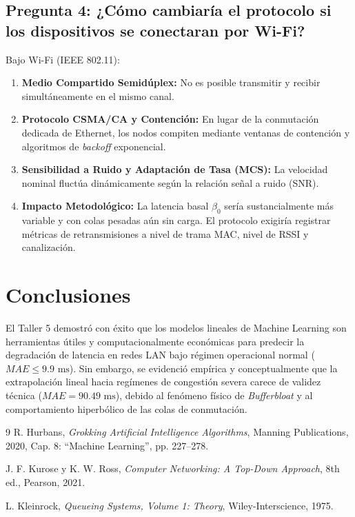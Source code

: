 \documentclass[10pt,twocolumn,letterpaper]{article}
\begin{document}
\subsection{Pregunta 4: ¿Cómo cambiaría el protocolo si los dispositivos se conectaran por Wi-Fi?}
Bajo Wi-Fi (IEEE 802.11):
\begin{enumerate}
    \item \textbf{Medio Compartido Semidúplex:} No es posible transmitir y recibir simultáneamente en el mismo canal.
    \item \textbf{Protocolo CSMA/CA y Contención:} En lugar de la conmutación dedicada de Ethernet, los nodos compiten mediante ventanas de contención y algoritmos de \textit{backoff} exponencial.
    \item \textbf{Sensibilidad a Ruido y Adaptación de Tasa (MCS):} La velocidad nominal fluctúa dinámicamente según la relación señal a ruido (SNR).
    \item \textbf{Impacto Metodológico:} La latencia basal $\beta_0$ sería sustancialmente más variable y con colas pesadas aún sin carga. El protocolo exigiría registrar métricas de retransmisiones a nivel de trama MAC, nivel de RSSI y canalización.
\end{enumerate}

\section{Conclusiones}
El Taller 5 demostró con éxito que los modelos lineales de Machine Learning son herramientas útiles y computacionalmente económicas para predecir la degradación de latencia en redes LAN bajo régimen operacional normal ($MAE \le 9.9\text{ ms}$). Sin embargo, se evidenció empírica y conceptualmente que la extrapolación lineal hacia regímenes de congestión severa carece de validez técnica ($MAE = 90.49\text{ ms}$), debido al fenómeno físico de \textit{Bufferbloat} y al comportamiento hiperbólico de las colas de conmutación.

\begin{thebibliography}{9}
R. Hurbans, \textit{Grokking Artificial Intelligence Algorithms}, Manning Publications, 2020, Cap. 8: ``Machine Learning'', pp. 227--278.

J. F. Kurose y K. W. Ross, \textit{Computer Networking: A Top-Down Approach}, 8th ed., Pearson, 2021.

L. Kleinrock, \textit{Queueing Systems, Volume 1: Theory}, Wiley-Interscience, 1975.
\end{thebibliography}
\end{document}

